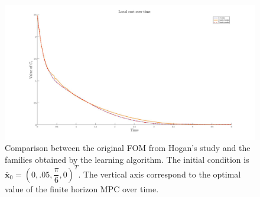 \documentclass[12,twoside]{TFG-GM}
\theoremstyle{definition}
\theoremstyle{remark}
\newcommand*\diff[1]{\bar{#1}}
\begin{document}
\begin{figure}[htb!]
\begin{center}
\includegraphics[width=16cm]{learning_straight.jpg}
\caption{\label{fig:cost_over_time_line} \small Comparison between the original FOM from Hogan's study and the families obtained by the learning algorithm. The initial condition is $\diff{\textbf{x}}_0 = (0, .05, \dfrac{\pi}{6}, 0)^T$. The vertical axis correspond to the optimal value of the finite horizon MPC over time.}
\end{center}
\end{figure}
\end{document}
